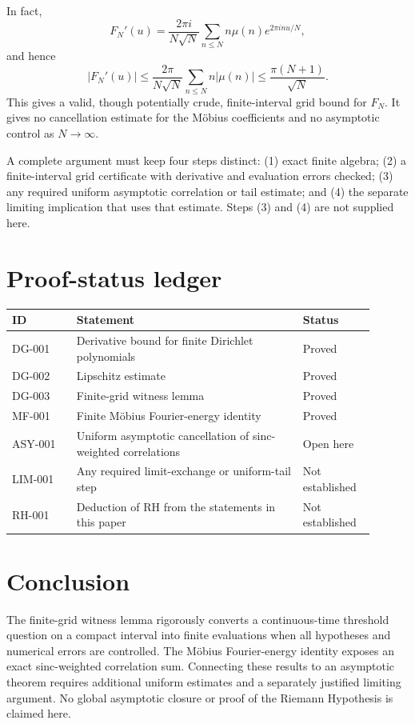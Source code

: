 \documentclass[11pt]{article}
\theoremstyle{definition}\newtheorem{definition}[theorem]{Definition}
\theoremstyle{remark}\newtheorem{remark}[theorem]{Remark}
\begin{document}
In fact,
\[
F_N'(u)=\frac{2\pi i}{N\sqrt N}\sum_{n\le N}n\mu(n)e^{2\pi inu/N},
\]
and hence
\[
|F_N'(u)|\le\frac{2\pi}{N\sqrt N}\sum_{n\le N}n|\mu(n)|
\le\frac{\pi(N+1)}{\sqrt N}.
\]
This gives a valid, though potentially crude, finite-interval grid bound for $F_N$. It gives no cancellation estimate for the Möbius coefficients and no asymptotic control as $N\to\infty$.

A complete argument must keep four steps distinct: (1) exact finite algebra; (2) a finite-interval grid certificate with derivative and evaluation errors checked; (3) any required uniform asymptotic correlation or tail estimate; and (4) the separate limiting implication that uses that estimate. Steps (3) and (4) are not supplied here.

\section{Proof-status ledger}
\begin{center}
\begin{tabular}{p{0.16\linewidth}p{0.57\linewidth}p{0.17\linewidth}}
\toprule
ID & Statement & Status\\
\midrule
DG-001 & Derivative bound for finite Dirichlet polynomials & Proved\\
DG-002 & Lipschitz estimate & Proved\\
DG-003 & Finite-grid witness lemma & Proved\\
MF-001 & Finite Möbius Fourier-energy identity & Proved\\
ASY-001 & Uniform asymptotic cancellation of sinc-weighted correlations & Open here\\
LIM-001 & Any required limit-exchange or uniform-tail step & Not established\\
RH-001 & Deduction of RH from the statements in this paper & Not established\\
\bottomrule
\end{tabular}
\end{center}

\section{Conclusion}
The finite-grid witness lemma rigorously converts a continuous-time threshold question on a compact interval into finite evaluations when all hypotheses and numerical errors are controlled. The Möbius Fourier-energy identity exposes an exact sinc-weighted correlation sum. Connecting these results to an asymptotic theorem requires additional uniform estimates and a separately justified limiting argument. No global asymptotic closure or proof of the Riemann Hypothesis is claimed here.
\end{document}

